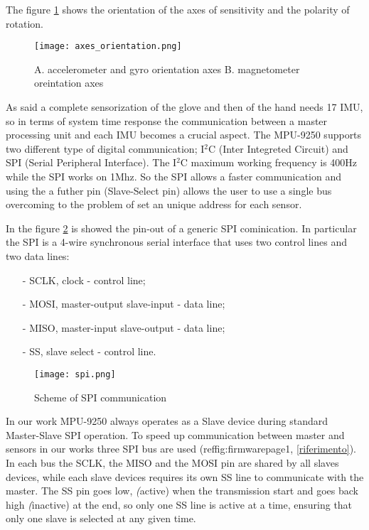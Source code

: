 The figure \ref{fig:axes} shows the orientation of the axes of sensitivity and the polarity of rotation.
\begin{figure}[h]
\centering
\texttt{[image: axes\_orientation.png]}
\caption{A. accelerometer and gyro orientation axes  B. magnetometer oreintation axes}
\label{fig:axes}
\end{figure}

As said a complete sensorization of the glove and then of the hand needs 17 IMU, so in terms of system time response the communication between a master processing unit and each IMU becomes a crucial aspect. The MPU-9250 supports two  different type of digital communication; I$^2$C (Inter Integreted Circuit) and SPI (Serial Peripheral Interface). The I$^2$C maximum working frequency is 400Hz while the SPI works on 1Mhz. So the SPI allows a faster communication and using the a futher pin (Slave-Select pin) allows the user to use a single bus overcoming to the problem of set an unique address for each sensor. 

In the figure \ref{fig:spi} is showed the pin-out of a generic SPI cominication. In particular the SPI is a 4-wire synchronous serial interface that uses two control lines and two data lines:
\begin{itemize}
\item[-] SCLK, clock - control line;
\item[-] MOSI, master-output slave-input - data line;
\item[-] MISO, master-input slave-output - data line;
\item[-] SS,   slave select - control line.
\end{itemize}

\begin{figure}[h]
\centering
\texttt{[image: spi.png]}
\caption{Scheme of SPI communication}
\label{fig:spi}
\end{figure}

In our work MPU-9250 always operates as a Slave device during standard Master-Slave SPI operation. To speed up communication between master and sensors in our works three SPI bus are used (ref{fig:firmwarepage1}, \ref{riferimento}).  
In each bus the SCLK, the MISO and the MOSI pin are shared by all slaves devices, while each slave devices requires its own SS line to communicate with the master. The SS pin goes low, \textit(active) when the transmission start and goes back high \textit(inactive) at the end, so only one SS line is active at a time, ensuring that only one slave is selected at any given time.   

